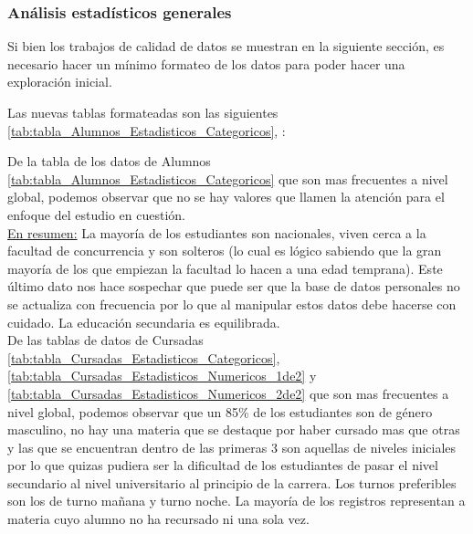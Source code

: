 
\subsubsection{Análisis estadísticos generales}

Si bien los trabajos de calidad de datos se muestran en la siguiente sección, es necesario hacer un mínimo formateo de los datos para poder hacer una exploración inicial.

Las nuevas tablas formateadas son las siguientes \ref{tab:tabla_Alumnos_Estadisticos_Categoricos},  :



De la tabla de los datos de Alumnos \ref{tab:tabla_Alumnos_Estadisticos_Categoricos} que son mas frecuentes a nivel global, podemos observar que no se hay valores que llamen la atención para el enfoque del estudio en cuestión. \\
\underline{En resumen:} La mayoría de los estudiantes son nacionales, viven cerca a la facultad de concurrencia y son solteros (lo cual es lógico sabiendo que la gran mayoría de los que empiezan la facultad lo hacen a una edad temprana). Este último dato nos hace sospechar que puede ser que la base de datos personales no se actualiza con frecuencia por lo que al manipular estos datos debe hacerse con cuidado.
La educación secundaria es equilibrada.
\\





De las tablas de datos de Cursadas \ref{tab:tabla_Cursadas_Estadisticos_Categoricos}, \ref{tab:tabla_Cursadas_Estadisticos_Numericos_1de2} y \ref{tab:tabla_Cursadas_Estadisticos_Numericos_2de2} que son mas frecuentes a nivel global, podemos observar que un 85\% de los estudiantes son de género masculino, no hay una materia que se destaque por haber cursado mas que otras y las que se encuentran dentro de las primeras 3 son aquellas de niveles iniciales por lo que quizas pudiera ser la dificultad de los estudiantes de pasar el nivel secundario al nivel universitario al principio de la carrera. Los turnos preferibles son los de turno mañana y turno noche. La mayoría de los registros representan a materia cuyo alumno no ha recursado ni una sola vez.

